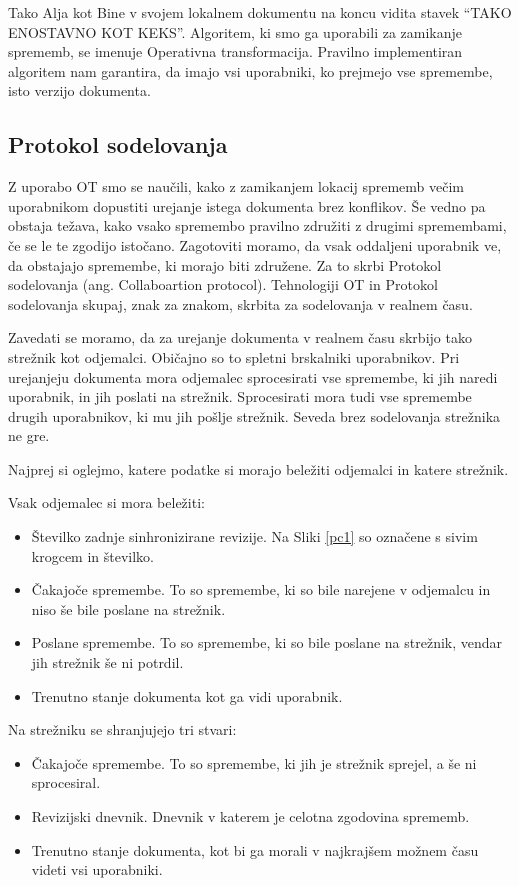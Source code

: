 \documentclass[a4paper, 12pt, twoside]{book}
\begin{document}
Tako Alja kot Bine v svojem lokalnem dokumentu na koncu vidita stavek “TAKO ENOSTAVNO KOT KEKS”. Algoritem, ki smo ga uporabili za zamikanje sprememb, se imenuje Operativna transformacija. Pravilno implementiran algoritem nam garantira, da imajo vsi uporabniki, ko prejmejo vse spremembe, isto verzijo dokumenta.

\subsection{Protokol sodelovanja}

Z uporabo OT smo se naučili, kako z zamikanjem lokacij sprememb večim uporabnikom dopustiti urejanje istega dokumenta brez konflikov. Še vedno pa obstaja težava, kako vsako spremembo pravilno združiti z drugimi spremembami, če se le te zgodijo istočano. Zagotoviti moramo, da vsak oddaljeni uporabnik ve, da obstajajo spremembe, ki morajo biti združene. Za to skrbi Protokol sodelovanja (ang. Collaboartion protocol). Tehnologiji OT in Protokol sodelovanja skupaj, znak za znakom, skrbita za sodelovanja v realnem času.

Zavedati se moramo, da za urejanje dokumenta v realnem času skrbijo tako strežnik kot odjemalci. Običajno so to spletni brskalniki uporabnikov. Pri urejanjeju dokumenta mora odjemalec sprocesirati vse spremembe, ki jih naredi uporabnik, in jih poslati na strežnik. Sprocesirati mora tudi vse spremembe drugih uporabnikov, ki mu jih pošlje strežnik. Seveda brez sodelovanja strežnika ne gre.

Najprej si oglejmo, katere podatke si morajo beležiti odjemalci in katere strežnik.

Vsak odjemalec si mora beležiti:
\begin{itemize}
	\item Številko zadnje sinhronizirane revizije. Na Sliki \ref{pc1} so označene s sivim krogcem in številko.
	\item Čakajoče spremembe. To so spremembe, ki so bile narejene v odjemalcu in niso še bile poslane na strežnik.
	\item Poslane spremembe. To so spremembe, ki so bile poslane na strežnik, vendar jih strežnik še ni potrdil.
	\item Trenutno stanje dokumenta kot ga vidi uporabnik.
\end{itemize}

Na strežniku se shranjujejo tri stvari:
\begin{itemize}
	\item Čakajoče spremembe. To so spremembe, ki jih je strežnik sprejel, a še ni sprocesiral.
	\item Revizijski dnevnik. Dnevnik v katerem je celotna zgodovina sprememb.
	\item Trenutno stanje dokumenta, kot bi ga morali v najkrajšem možnem času videti vsi uporabniki.
\end{itemize}
\end{document}

